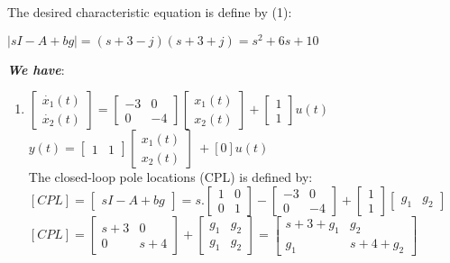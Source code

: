 \documentclass[14pt,a4paper]{article}
\begin{document}
\hspace*{1cm} The desired characteristic equation is define by (1): 
		\begin{center}
		$|sI-A+bg| = (s+3-j)(s+3+j) = s^2 + 6s + 10 $ 
		\end{center}
	\textbf{\textit{We have}}:
\begin{enumerate}
	\doublespacing
	\item 
		$\begin{bmatrix}\dot{x_1}(t)\\ \dot{x_2}(t) \end{bmatrix} = \begin{bmatrix}-3&0 \\0&-4 \end{bmatrix} \begin{bmatrix}x_1(t) \\ x_2(t) \end{bmatrix} + \begin{bmatrix} 1\\1 \end{bmatrix}u(t)$ \\
		
		\hspace*{0.6cm} $y(t) = \begin{bmatrix} 1&1 \end{bmatrix} \begin{bmatrix} x_1(t)\\x_2(t) \end{bmatrix}\ + [0]u(t) $ \\
		
		The closed-loop pole locations (CPL) is defined by:\\
		$[CPL] = \begin{bmatrix} sI-A+bg \end{bmatrix} = s.\begin{bmatrix}1&0\\0&1 \end{bmatrix} - \begin{bmatrix}-3&0 \\0&-4 \end{bmatrix} +  \begin{bmatrix} 1\\1 \end{bmatrix} \begin{bmatrix} g_1 & g_2 \end{bmatrix}$\\[0.2cm]
		$[CPL] = \begin{bmatrix}s+3&0 \\0&s+4 \end{bmatrix} + \begin{bmatrix} g_1 & g_2  \\g_1 & g_2\end{bmatrix} = \begin{bmatrix}s+3+g_1&g_2 \\g_1&s+4+g_2 \end{bmatrix} $\\
		

\end{enumerate}
\end{document}
